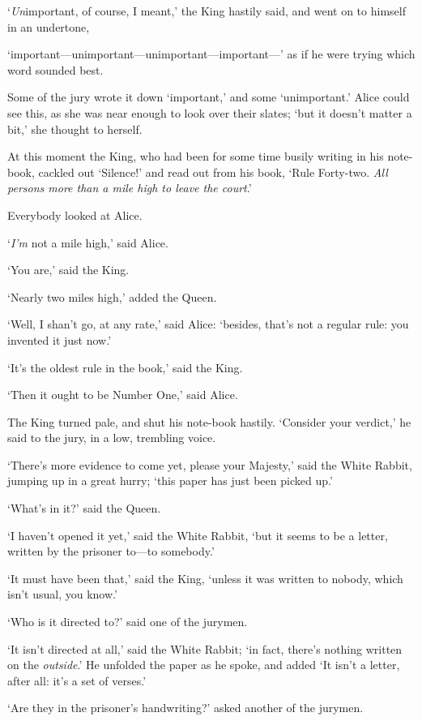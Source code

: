 \documentclass[12pt,openany]{memoir}
\begin{document}
`\textit{Un}important, of course, I meant,' the King hastily said, and went on to himself in an undertone,

`important---unimportant---unimportant---important---' as if he were trying which word sounded best.

Some of the jury wrote it down `important,' and some `unimportant.' Alice could see this, as she was near enough to look over their slates; `but it doesn't matter a bit,' she thought to herself.

At this moment the King, who had been for some time busily writing in his note-book, cackled out `Silence!' and read out from his book, `Rule Forty-two. \textit{All persons more than a mile high to leave the court}.'

Everybody looked at Alice.

`\textit{I'm} not a mile high,' said Alice.

`You are,' said the King.

`Nearly two miles high,' added the Queen.

`Well, I shan't go, at any rate,' said Alice: `besides, that's not a regular rule: you invented it just now.'

`It's the oldest rule in the book,' said the King.

`Then it ought to be Number One,' said Alice.

The King turned pale, and shut his note-book hastily. `Consider your verdict,' he said to the jury, in a low, trembling voice.

`There's more evidence to come yet, please your Majesty,' said the White Rabbit, jumping up in a great hurry; `this paper has just been picked up.'

`What's in it?' said the Queen.

`I haven't opened it yet,' said the White Rabbit, `but it seems to be a letter, written by the prisoner to---to somebody.'

`It must have been that,' said the King, `unless it was written to nobody, which isn't usual, you know.'

`Who is it directed to?' said one of the jurymen.

`It isn't directed at all,' said the White Rabbit; `in fact, there's nothing written on the \textit{outside}.' He unfolded the paper as he spoke, and added `It isn't a letter, after all: it's a set of verses.'

`Are they in the prisoner's handwriting?' asked another of the jurymen.
\end{document}
